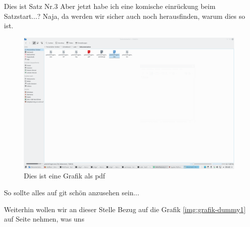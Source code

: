 \documentclass[a4paper,12pt]{article}
\begin{document}
Dies ist Satz Nr.3
Aber jetzt habe ich eine komische einrückung beim Satzstart...?
Naja, da werden wir sicher auch noch herausfinden, warum dies so ist.
\begin{figure}
	\centering
	\includegraphics[scale=0.2]{BilderEinleitung/bild.png}
	\caption{Dies ist eine Grafik als pdf}
	\label{img:grafik-dummy2}
\end{figure}
	

So sollte alles auf git schön anzusehen sein...

Weiterhin wollen wir an dieser Stelle Bezug auf die Grafik
\ref{img:grafik-dummy1} auf Seite \pageref{img:grafik-dummy1} nehmen, was uns
\end{document}

